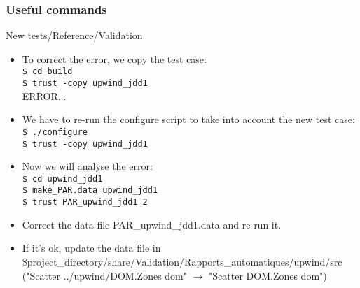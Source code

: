 \documentclass[10pt, hyperref={unicode=true,pdfusetitle, bookmarks=true,bookmarksnumbered=false,bookmarksopen=false, breaklinks=false,pdfborder={0 0 1},backref=true,colorlinks=true,linkcolor=darkblue,pageanchor, urlcolor=darkblue}]{beamer}
\begin{document}
\begin{frame}
\frametitle{Useful commands}
\begin{block}{New tests/Reference/Validation}

\begin{itemize}
\item To correct the error, we copy the test case:\\
\texttt{\$ cd build}\\
\texttt{\$ trust -copy upwind\_jdd1}\\
ERROR...
\item We have to re-run the configure script to take into account the new test case:\\
\texttt{\$ ./configure}\\
\texttt{\$ trust -copy upwind\_jdd1}
\item Now we will analyse the error:\\
\texttt{\$ cd upwind\_jdd1}\\
\texttt{\$ make\_PAR.data upwind\_jdd1}\\
\texttt{\$ trust PAR\_upwind\_jdd1 2}\\
\item Correct the data file PAR\_upwind\_jdd1.data and re-run it.
\item If it's ok, update the data file in 
\$project\_directory/share/Validation/Rapports\_automatiques/upwind/src\\
("Scatter ../upwind/DOM.Zones dom" $\rightarrow$ "Scatter DOM.Zones dom")\\
\end{itemize}

\end{block}
\end{frame}
\end{document}
